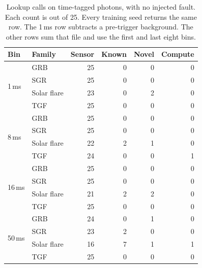 \begin{table}[t]
\caption{Lookup calls on time-tagged photons, with no injected fault. Each count is out of 25. Every training seed returns the same row. The 1\,ms row subtracts a pre-trigger background. The other rows sum that file and use the first and last eight bins.}
\label{tab:ttelookup}
\centering
\small
\begin{tabular}{llrrrr}
\toprule
Bin & Family & Sensor & Known & Novel & Compute \\
\midrule
\multirow{4}{*}{1\,ms}
 & GRB & 25 & 0 & 0 & 0 \\
 & SGR & 25 & 0 & 0 & 0 \\
 & Solar flare & 23 & 0 & 2 & 0 \\
 & TGF & 25 & 0 & 0 & 0 \\
\midrule
\multirow{4}{*}{8\,ms}
 & GRB & 25 & 0 & 0 & 0 \\
 & SGR & 25 & 0 & 0 & 0 \\
 & Solar flare & 22 & 2 & 1 & 0 \\
 & TGF & 24 & 0 & 0 & 1 \\
\midrule
\multirow{4}{*}{16\,ms}
 & GRB & 25 & 0 & 0 & 0 \\
 & SGR & 25 & 0 & 0 & 0 \\
 & Solar flare & 21 & 2 & 2 & 0 \\
 & TGF & 25 & 0 & 0 & 0 \\
\midrule
\multirow{4}{*}{50\,ms}
 & GRB & 24 & 0 & 1 & 0 \\
 & SGR & 23 & 2 & 0 & 0 \\
 & Solar flare & 16 & 7 & 1 & 1 \\
 & TGF & 25 & 0 & 0 & 0 \\
\bottomrule
\end{tabular}
\end{table}
